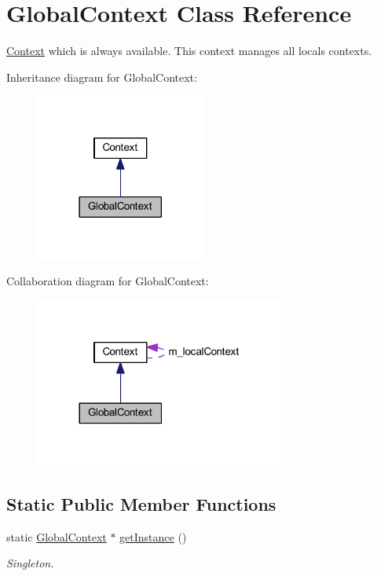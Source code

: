 \hypertarget{class_global_context}{\section{Global\-Context Class Reference}
\label{class_global_context}
}


\hyperlink{class_context}{Context} which is always available. This context manages all locals contexts.  




Inheritance diagram for Global\-Context\-:\nopagebreak
\begin{figure}[H]
\begin{center}
\leavevmode
\includegraphics[width=158pt]{class_global_context__inherit__graph}
\end{center}
\end{figure}


Collaboration diagram for Global\-Context\-:\nopagebreak
\begin{figure}[H]
\begin{center}
\leavevmode
\includegraphics[width=233pt]{class_global_context__coll__graph}
\end{center}
\end{figure}
\subsection*{Static Public Member Functions}
\begin{DoxyCompactItemize}
\item 
\hypertarget{class_global_context_a1ccee0c92d355aa269004a7eac17c07f}{static \hyperlink{class_global_context}{Global\-Context} $\ast$ \hyperlink{class_global_context_a1ccee0c92d355aa269004a7eac17c07f}{get\-Instance} ()}\label{class_global_context_a1ccee0c92d355aa269004a7eac17c07f}

\begin{DoxyCompactList}\small\item\em Singleton. \end{DoxyCompactList}\end{DoxyCompactItemize}
